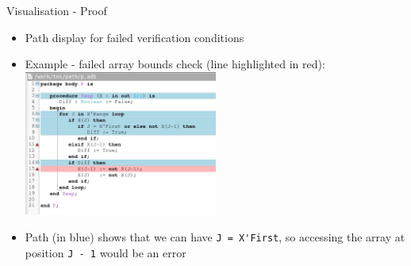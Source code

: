 \documentclass{beamer}
\begin{document}
\begin{frame}[fragile]{Visualisation - Proof}

  \begin{itemize}

  \item Path display for failed verification conditions
  \item Example - failed array bounds check (line highlighted in red):
  \includegraphics[width=0.5\textwidth]{show_path.jpg}
  \item Path (in blue) shows that we can have \verb|J = X'First|, so accessing the array at position \verb|J - 1| would be an error

  \end{itemize}

\end{frame}
\end{document}
